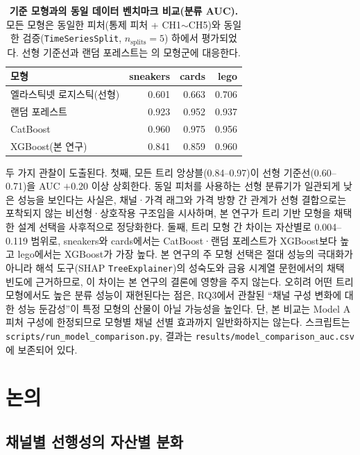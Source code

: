 \documentclass[11pt, a4paper, twocolumn]{article}
\begin{document}
\begin{table}[!t]
\centering\small
\caption[벤치마크 모형 비교]{\textbf{기준 모형과의 동일 데이터 벤치마크
비교(분류 AUC).} 모든 모형은 동일한 피처(통제 피처 + CH1$\sim$CH5)와
동일한 검증(\texttt{TimeSeriesSplit}, $n_{\text{splits}}=5$) 하에서
평가되었다. 선형 기준선과 랜덤 포레스트는 \citet{radityaetal2021}의
모형군에 대응한다.}
\label{tab:benchmark}
\footnotesize
\setlength{\tabcolsep}{4pt}
\begin{tabular}{lrrr}
\toprule
모형 & sneakers & cards & lego \\
\midrule
엘라스틱넷 로지스틱(선형) & 0.601 & 0.663 & 0.706 \\
랜덤 포레스트            & 0.923 & 0.952 & 0.937 \\
CatBoost                 & 0.960 & 0.975 & 0.956 \\
XGBoost(본 연구)         & 0.841 & 0.859 & 0.960 \\
\bottomrule
\end{tabular}
\end{table}

두 가지 관찰이 도출된다. 첫째, 모든 트리 앙상블(0.84--0.97)이 선형
기준선(0.60--0.71)을 AUC $+0.20$ 이상 상회한다. 동일 피처를 사용하는
선형 분류기가 일관되게 낮은 성능을 보인다는 사실은, 채널·가격 래그와
가격 방향 간 관계가 선형 결합으로는 포착되지 않는 비선형·상호작용
구조임을 시사하며, 본 연구가 트리 기반 모형을 채택한 설계 선택을
사후적으로 정당화한다. 둘째, 트리 모형 간 차이는 자산별로
0.004--0.119 범위로, sneakers와 cards에서는 CatBoost·랜덤 포레스트가
XGBoost보다 높고 lego에서는 XGBoost가 가장 높다. 본 연구의 주 모형
선택은 절대 성능의 극대화가 아니라 해석 도구(SHAP
\texttt{TreeExplainer})의 성숙도와 금융 시계열 문헌에서의 채택 빈도에
근거하므로, 이 차이는 본 연구의 결론에 영향을 주지 않는다. 오히려
어떤 트리 모형에서도 높은 분류 성능이 재현된다는 점은, RQ3에서 관찰된
``채널 구성 변화에 대한 성능 둔감성''이 특정 모형의 산물이 아닐
가능성을 높인다. 단, 본 비교는 Model A 피처 구성에 한정되므로 모형별
채널 선별 효과까지 일반화하지는 않는다. 스크립트는
\texttt{scripts/run\_model\_comparison.py}, 결과는
\texttt{results/model\_comparison\_auc.csv}에 보존되어 있다.

\section{논의}\label{sec:discussion}

\subsection{채널별 선행성의 자산별 분화}\label{sec:discussion-rq12}
\end{document}
